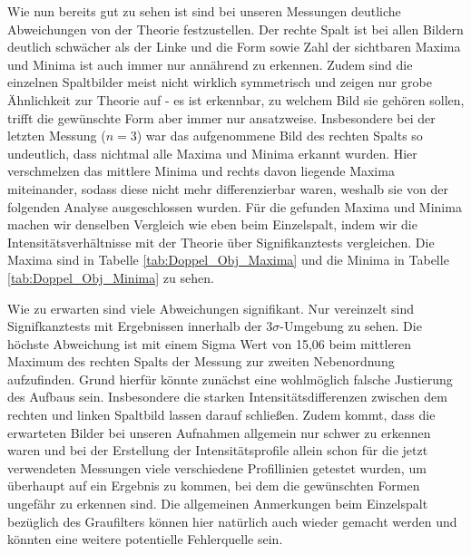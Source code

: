 \documentclass{article}
\begin{document}
\clearpage
\newpage

Wie nun bereits gut zu sehen ist sind bei unseren Messungen deutliche Abweichungen von der Theorie festzustellen. Der rechte Spalt ist bei allen Bildern deutlich schwächer als der Linke und die Form sowie Zahl der sichtbaren Maxima und Minima ist auch immer nur annährend zu erkennen. Zudem sind die einzelnen Spaltbilder meist nicht wirklich symmetrisch und zeigen nur grobe Ähnlichkeit zur Theorie auf - es ist erkennbar, zu welchem Bild sie gehören sollen, trifft die gewünschte Form aber immer nur ansatzweise. Insbesondere bei der letzten Messung ($n=3$) war das aufgenommene Bild des rechten Spalts so undeutlich, dass nichtmal alle Maxima und Minima erkannt wurden. Hier verschmelzen das mittlere Minima und rechts davon liegende Maxima miteinander, sodass diese nicht mehr differenzierbar waren, weshalb sie von der folgenden Analyse ausgeschlossen wurden. Für die gefunden Maxima und Minima machen wir denselben Vergleich wie eben beim Einzelspalt, indem wir die Intensitätsverhältnisse mit der Theorie über Signifikanztests vergleichen. Die Maxima sind in Tabelle \ref{tab:Doppel_Obj_Maxima} und die Minima in Tabelle \ref{tab:Doppel_Obj_Minima} zu sehen.

Wie zu erwarten sind viele Abweichungen signifikant. Nur vereinzelt sind Signifkanztests mit Ergebnissen innerhalb der $3\sigma$-Umgebung zu sehen. Die höchste Abweichung ist mit einem Sigma Wert von 15,06 beim mittleren Maximum des rechten Spalts der Messung zur zweiten Nebenordnung aufzufinden. Grund hierfür könnte zunächst eine wohlmöglich falsche Justierung des Aufbaus sein. Insbesondere die starken Intensitätsdifferenzen zwischen dem rechten und linken Spaltbild lassen darauf schließen. Zudem kommt, dass die erwarteten Bilder bei unseren Aufnahmen allgemein nur schwer zu erkennen waren und bei der Erstellung der Intensitätsprofile allein schon für die jetzt verwendeten Messungen viele verschiedene Profillinien getestet wurden, um überhaupt auf ein Ergebnis zu kommen, bei dem die gewünschten Formen ungefähr zu erkennen sind. Die allgemeinen Anmerkungen beim Einzelspalt bezüglich des Graufilters können hier natürlich auch wieder gemacht werden und könnten eine weitere potentielle Fehlerquelle sein.  
\end{document}
